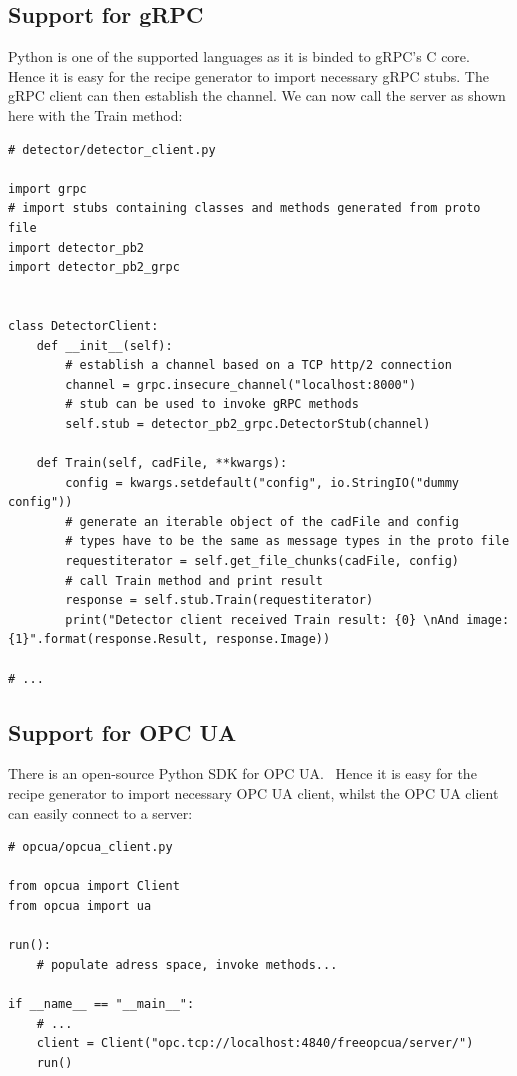 \subsection{Support for gRPC}
\label{sec:grpcpython}
Python is one of the supported languages as it is binded to gRPC's C core.~\cite{gRPC-Documentation2019Last2019} Hence it is easy for the recipe generator to import necessary gRPC stubs. The gRPC client can then establish the channel. We can now call the server as shown here with the Train method:

\begin{verbatim}
# detector/detector_client.py

import grpc
# import stubs containing classes and methods generated from proto file
import detector_pb2
import detector_pb2_grpc


class DetectorClient:
    def __init__(self):
        # establish a channel based on a TCP http/2 connection
        channel = grpc.insecure_channel("localhost:8000")
        # stub can be used to invoke gRPC methods
        self.stub = detector_pb2_grpc.DetectorStub(channel)
    
    def Train(self, cadFile, **kwargs):
        config = kwargs.setdefault("config", io.StringIO("dummy config"))
        # generate an iterable object of the cadFile and config
        # types have to be the same as message types in the proto file
        requestiterator = self.get_file_chunks(cadFile, config)
        # call Train method and print result
        response = self.stub.Train(requestiterator)
        print("Detector client received Train result: {0} \nAnd image: {1}".format(response.Result, response.Image))
        
# ...
\end{verbatim}

\subsection{Support for OPC UA}
There is an open-source Python SDK for OPC UA.~\cite{N.A.OPC2019} Hence it is easy for the recipe generator to import necessary OPC UA client, whilst the OPC UA client can easily connect to a server:
\begin{verbatim}
# opcua/opcua_client.py

from opcua import Client
from opcua import ua

run():
    # populate adress space, invoke methods...

if __name__ == "__main__":
    # ...
    client = Client("opc.tcp://localhost:4840/freeopcua/server/")
    run()
\end{verbatim}


